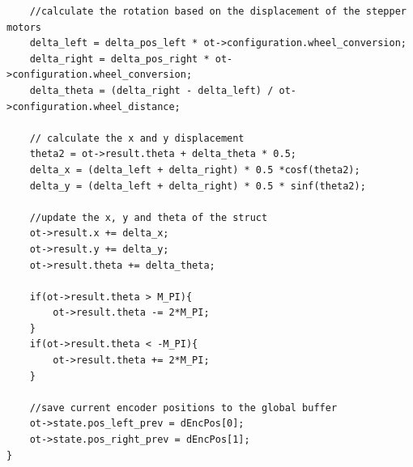 \documentclass[10pt,a4paper]{article}
\begin{document}
\begin{flushleft}
\begin{lstlisting}
	//calculate the rotation based on the displacement of the stepper motors 
	delta_left = delta_pos_left * ot->configuration.wheel_conversion;
	delta_right = delta_pos_right * ot->configuration.wheel_conversion;
	delta_theta = (delta_right - delta_left) / ot->configuration.wheel_distance;
	
	// calculate the x and y displacement 
	theta2 = ot->result.theta + delta_theta * 0.5;
	delta_x = (delta_left + delta_right) * 0.5 *cosf(theta2);
	delta_y = (delta_left + delta_right) * 0.5 * sinf(theta2);
	
	//update the x, y and theta of the struct
	ot->result.x += delta_x;
	ot->result.y += delta_y;
	ot->result.theta += delta_theta;
	
	if(ot->result.theta > M_PI){
		ot->result.theta -= 2*M_PI;
	}
	if(ot->result.theta < -M_PI){
		ot->result.theta += 2*M_PI;
	}
	
	//save current encoder positions to the global buffer 
	ot->state.pos_left_prev = dEncPos[0];
	ot->state.pos_right_prev = dEncPos[1];
}
\end{lstlisting}



\nocite{*}
\newpage

\end{flushleft}
\end{document}
